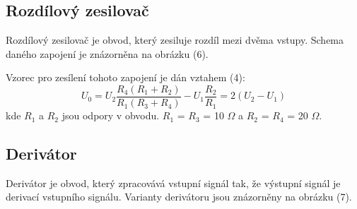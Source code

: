 \documentclass[a4paper,11pt]{article}
\begin{document}
\begin{minipage}[t]{0.5\textwidth}
            \subsection{Rozdílový zesilovač}
                Rozdílový zesilovač je obvod, který zesiluje rozdíl mezi dvěma vstupy. Schema daného zapojení je znázorněna na obrázku (6). 
                \par Vzorec pro zesílení tohoto zapojení je dán vztahem (4):
                \begin{equation}
                    U_0 = U_2 \frac{R_4(R_1+R_2)}{R_1(R_3+R_4)} - U_1 \frac{R_2}{R_1} = 2(U_2 - U_1)
                \end{equation}
                kde $R_1$ a $R_2$ jsou odpory v obvodu. $R_1$ = $R_3$ = 10 $\Omega$ a $R_2$ = $R_4$ = 20 $\Omega$.

            \subsection{Derivátor}  
                Derivátor je obvod, který zpracovává vstupní signál tak, že výstupní signál je derivací vstupního signálu. Varianty derivátoru jsou znázorněny na obrázku (7).
    \end{minipage}
\newpage
\end{document}
